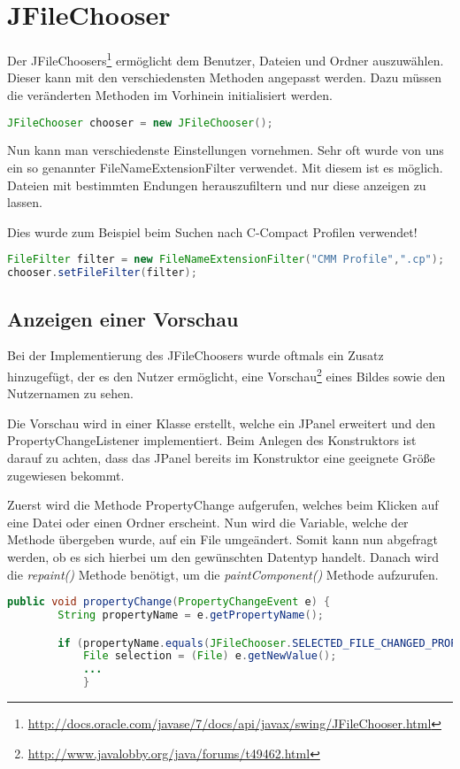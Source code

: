 \section{JFileChooser}
\label{sec:JFileChooser}

Der JFileChoosers\footnote{\url{http://docs.oracle.com/javase/7/docs/api/javax/swing/JFileChooser.html}} ermöglicht dem Benutzer, Dateien und Ordner auszuwählen. Dieser kann mit den verschiedensten Methoden angepasst werden. Dazu müssen die veränderten Methoden im Vorhinein initialisiert werden.

\begin{lstlisting}[language=JAVA]
JFileChooser chooser = new JFileChooser();
\end{lstlisting}
    
Nun kann man verschiedenste Einstellungen vornehmen. Sehr oft wurde von uns ein so genannter FileNameExtensionFilter verwendet. Mit diesem ist es möglich. Dateien mit bestimmten Endungen herauszufiltern und nur diese anzeigen zu lassen.

Dies wurde zum Beispiel beim Suchen nach C-Compact Profilen verwendet!
\begin{lstlisting}[language=JAVA]
FileFilter filter = new FileNameExtensionFilter("CMM Profile",".cp");
chooser.setFileFilter(filter);
\end{lstlisting}



\subsection{Anzeigen einer Vorschau}
Bei der Implementierung des JFileChoosers wurde oftmals ein Zusatz hinzugefügt, der es den Nutzer ermöglicht, eine Vorschau\footnote{\url{http://www.javalobby.org/java/forums/t49462.html}} eines Bildes sowie den Nutzernamen zu sehen.

Die Vorschau wird in einer Klasse erstellt, welche ein JPanel erweitert und den PropertyChangeListener implementiert. Beim Anlegen des Konstruktors ist darauf zu achten, dass das JPanel bereits im Konstruktor eine geeignete Größe zugewiesen bekommt.

Zuerst wird die Methode PropertyChange aufgerufen, welches beim Klicken auf eine Datei oder einen Ordner erscheint. Nun wird die Variable, welche der Methode übergeben wurde, auf ein File umgeändert. Somit kann nun abgefragt werden, ob es sich hierbei um den gewünschten Datentyp handelt. Danach wird die \textit{repaint()} Methode benötigt, um die \textit{paintComponent()} Methode aufzurufen.
\begin{lstlisting}[language=JAVA]
	public void propertyChange(PropertyChangeEvent e) {
		String propertyName = e.getPropertyName();

		if (propertyName.equals(JFileChooser.SELECTED_FILE_CHANGED_PROPERTY)) {
			File selection = (File) e.getNewValue();
			...
			}
\end{lstlisting}

